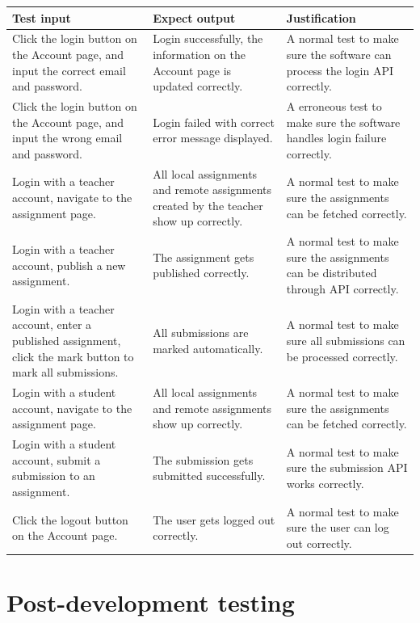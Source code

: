 \documentclass[a4paper]{report}
\begin{document}
\begin{tabulary}{\textwidth}{|L|L|L|}
    \hline
    Test input & Expect output & Justification \\
    \hline
    Click the login button on the Account page, and input the correct email and password. & Login successfully, the information on the Account page is updated correctly. & A normal test to make sure the software can process the login API correctly. \\
    \hline
    Click the login button on the Account page, and input the wrong email and password. & Login failed with correct error message displayed. & A erroneous test to make sure the software handles login failure correctly. \\
    \hline
    Login with a teacher account, navigate to the assignment page. & All local assignments and remote assignments created by the teacher show up correctly. & A normal test to make sure the assignments can be fetched correctly. \\
    \hline
    Login with a teacher account, publish a new assignment. & The assignment gets published correctly. & A normal test to make sure the assignments can be distributed through API correctly. \\
    \hline
    Login with a teacher account, enter a published assignment, click the mark button to mark all submissions. & All submissions are marked automatically. & A normal test to make sure all submissions can be processed correctly. \\
    \hline
    Login with a student account, navigate to the assignment page. & All local assignments and remote assignments show up correctly. & A normal test to make sure the assignments can be fetched correctly. \\
    \hline
    Login with a student account, submit a submission to an assignment. & The submission gets submitted successfully. & A normal test to make sure the submission API works correctly. \\
    \hline
    Click the logout button on the Account page. & The user gets logged out correctly. & A normal test to make sure the user can log out correctly. \\
    \hline
\end{tabulary}

\section{Post-development testing}
\end{document}
